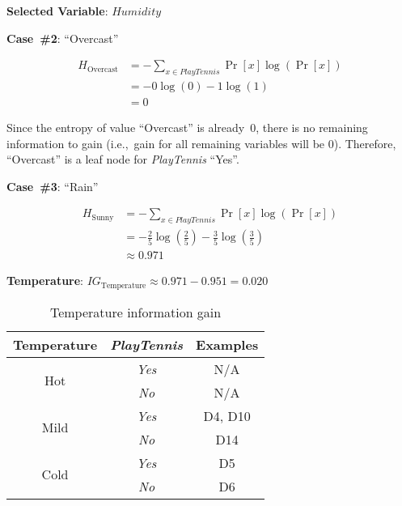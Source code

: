 \begin{center}
  \textbf{Selected Variable}: $\boxed{Humidity}$
\end{center}

\noindent
{\large \textbf{Case~\#2}: ``Overcast''}

\begin{align*}
  H_{\text{Overcast}} &= -\sum_{x\in PlayTennis} \Pr[x] \log \left(\Pr[x] \right)\\
                      &= - 0 \log(0) - 1 \log(1) \\
                      &= 0
\end{align*}

Since the entropy of value ``Overcast'' is already~0, there is no remaining information to gain (i.e.,~gain for all remaining variables will be 0).  Therefore, ``Overcast'' is a leaf node for \textit{PlayTennis} ``Yes''.

\noindent
{\large \textbf{Case~\#3}: ``Rain''}

\begin{align*}
  H_{\text{Sunny}} &= -\sum_{x\in PlayTennis} \Pr[x] \log \left(\Pr[x]\right) \\
                   &= - \frac{2}{5} \log\left(\frac{2}{5}\right) - \frac{3}{5} \log\left(\frac{3}{5}\right) \\
                   &\approx 0.971
\end{align*}

\noindent
\textbf{Temperature}: $IG_{\text{Temperature}} \approx 0.971 - 0.951 = \boxed{0.020}$

  \begin{table}[h]
    \centering
    \caption{Temperature information gain}
    \begin{tabular}{c|c|c}
      \hline
      Temperature  & \textit{PlayTennis} & Examples \\\hline\hline
      \multirow{2}{*}{Hot}  & \textit{Yes} & N/A \\
                            & \textit{No}  & N/A \\\hline
      \multirow{2}{*}{Mild} & \textit{Yes} & D4, D10 \\
                            & \textit{No}  & D14 \\\hline
      \multirow{2}{*}{Cold} & \textit{Yes} & D5 \\
                            & \textit{No}  & D6 \\\hline
    \end{tabular}
  \end{table}

